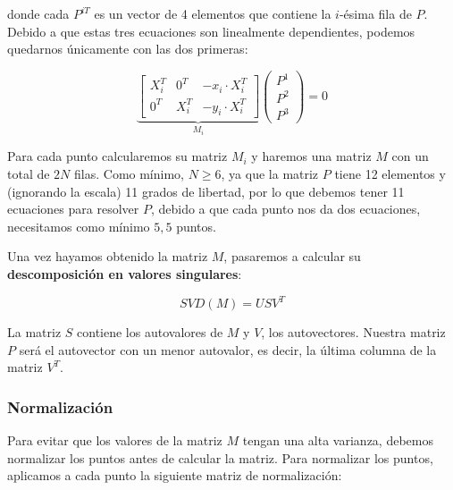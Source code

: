 \documentclass[11pt,a4paper]{article}
\theoremstyle{plain}
\theoremstyle{definition}
\begin{document}
donde cada $P^{iT}$ es un vector de 4 elementos que contiene la $i$-ésima fila de $P$. Debido a que estas tres ecuaciones son linealmente dependientes, podemos quedarnos únicamente con las dos primeras:

\begin{displaymath}
\underbrace{\left[ 
    \begin{array}{ccc}
    X_i^T & 0^T & -x_i\cdot X_i^T\\
    0^T & X_i^T & -y_i\cdot X_i^T
    \end{array} \right]}_{M_i} \left( \begin{array}{c}
    P^1 \\
    P^2 \\
    P^3 
    \end{array} \right) = 0
\end{displaymath}

Para cada punto calcularemos su matriz $M_i$ y haremos una matriz $M$ con un total de $2N$ filas. Como mínimo, $N \geq 6$, ya que la matriz $P$ tiene 12 elementos y (ignorando la escala) 11 grados de libertad, por lo que debemos tener 11 ecuaciones para resolver $P$, debido a que cada punto nos da dos ecuaciones, necesitamos como mínimo $5,5$ puntos.

Una vez hayamos obtenido la matriz $M$, pasaremos a calcular su \textbf{descomposición en valores singulares}:

\begin{displaymath}
SVD(M) = USV^T
\end{displaymath}

La matriz $S$ contiene los autovalores de $M$ y $V$, los autovectores. Nuestra matriz $P$ será el autovector con un menor autovalor, es decir, la última columna de la matriz $V^T$.

\subsubsection{Normalización}

Para evitar que los valores de la matriz $M$ tengan una alta varianza, debemos normalizar los puntos antes de calcular la matriz. Para normalizar los puntos, aplicamos a cada punto la siguiente matriz de normalización:
\end{document}
